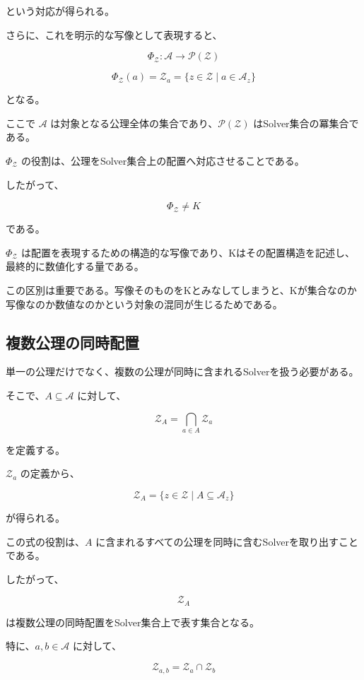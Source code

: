 という対応が得られる。

さらに、これを明示的な写像として表現すると、

\[
\boxed{
\Phi_{\mathcal{Z}}:\mathcal{A}\longrightarrow\mathcal{P}(\mathcal{Z})
}
\]

\[
\boxed{
\Phi_{\mathcal{Z}}(a) = \mathcal{Z}_a = \{z\in\mathcal{Z}\mid a\in\mathcal{A}_z\}
}
\]

となる。

ここで $\mathcal{A}$ は対象となる公理全体の集合であり、$\mathcal{P}(\mathcal{Z})$ はSolver集合の冪集合である。

$\Phi_{\mathcal{Z}}$ の役割は、公理をSolver集合上の配置へ対応させることである。

したがって、

\[
\boxed{
\Phi_{\mathcal{Z}}\neq K
}
\]

である。

$\Phi_{\mathcal{Z}}$ は配置を表現するための構造的な写像であり、Kはその配置構造を記述し、最終的に数値化する量である。

この区別は重要である。写像そのものをKとみなしてしまうと、Kが集合なのか写像なのか数値なのかという対象の混同が生じるためである。

\subsection{複数公理の同時配置}

単一の公理だけでなく、複数の公理が同時に含まれるSolverを扱う必要がある。

そこで、$A\subseteq\mathcal{A}$ に対して、

\[
\boxed{
\mathcal{Z}_A = \bigcap_{a\in A}\mathcal{Z}_a
}
\]

を定義する。

$\mathcal{Z}_a$ の定義から、

\[
\boxed{
\mathcal{Z}_A = \{z\in\mathcal{Z}\mid A\subseteq\mathcal{A}_z\}
}
\]

が得られる。

この式の役割は、$A$ に含まれるすべての公理を同時に含むSolverを取り出すことである。

したがって、

\[
\mathcal{Z}_A
\]

は複数公理の同時配置をSolver集合上で表す集合となる。

特に、$a,b\in\mathcal{A}$ に対して、

\[
\boxed{
\mathcal{Z}_{{a,b}} = \mathcal{Z}_a\cap\mathcal{Z}_b
}
\]

